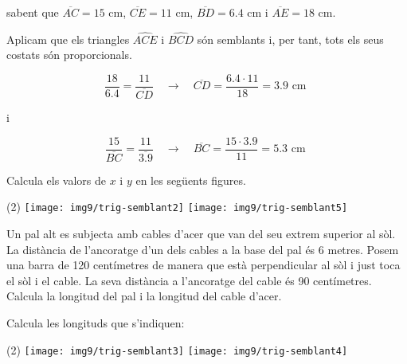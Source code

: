 \begin{mylist}
\begin{resolt}[E]
{sabent que  $\overline{AC}=15$ cm, $\overline{CE}=11$ cm, $\overline{BD}=6.4$ cm i $\overline{AE}=18$ cm.
}
		
		Aplicam que els triangles $\widehat{ACE}$ i $\widehat{BCD}$ són semblants i, per tant, tots els seus costats són proporcionals.
		
		\[ \frac{18}{6.4} = \frac{11}{\overline{CD}}  \quad \rightarrow \quad \overline{CD} = \frac{6.4 \cdot 11}{18} = 3.9 \text{ cm } \]
		
		\quad i
		
		
		\[ \frac{15}{\overline{BC}} = \frac{11}{\overline{3.9}}  \quad \rightarrow \quad \overline{BC} = \frac{15 \cdot 3.9}{11} = 5.3 \text{ cm } \]
\end{resolt}
\newpage

\exer[1]  Calcula els valors de  $x$ i $y$ en les següents figures. 

\begin{tasks}(2)
	\task   \texttt{[image: img9/trig-semblant2]}
	\task    \texttt{[image: img9/trig-semblant5]}
\end{tasks}
\answers[cols=1]{[$x=4$ i $y=3$ cm, $x=6$ i $y=18$ cm]}

\exer  Un pal alt es subjecta amb cables d'acer que van del seu extrem superior al sòl. La distància de l'ancoratge d'un dels cables a la base del pal és 6 metres. Posem una barra de 120 centímetres de manera que està perpendicular al sòl i just toca el sòl i el cable. La seva distància a l'ancoratge del cable és 90 centímetres. Calcula la longitud del pal i la longitud del cable d'acer.


\exer  Calcula les longituds que s'indiquen:
\begin{tasks}(2)
	\task    \texttt{[image: img9/trig-semblant3]}
	\task   \texttt{[image: img9/trig-semblant4]}
\end{tasks}

\answers[cols=1]{[$x=2$; $y=1.375$ cm,  $x=9$; $y=3$; $z=4.5$ cm]}

\end{mylist}
 


